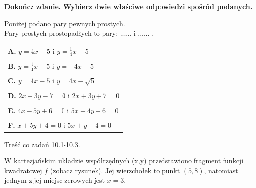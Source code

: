 \documentclass[12pt,a4paper]{article}
\theoremstyle{break}
\begin{document}
	\begin{zad}[0-3]
		
	\end{zad} 

	\begin{zad}[0-2]
		\textbf{Dokończ zdanie. Wybierz \underline{dwie} właściwe odpowiedzi spośród podanych.}
	\end{zad} 

	Poniżej podano pary pewnych prostych.
	\\
	
	Pary prostych prostopadłych to pary: ...... i ...... .
	
	\vspace{0.5cm}
	\begin{tabular}{p{14cm}}
		\textbf{A. }$y=4x-5$ i $y=\frac{1}{4}x-5$\\
		\\
		\textbf{B. }$y=\frac{1}{4}x+5$ i $y=-4x+5$\\
		\\
		\textbf{C. }$y=4x-5$ i $y=4x-\sqrt{5}$\\
		\\
		\textbf{D. }$2x-3y-7=0$ i $2x+3y+7=0$\\
		\\
		\textbf{E. }$4x-5y+6=0$ i $5x+4y-6=0$\\
		\\
		\textbf{F. }$x+5y+4=0$ i $5x+y-4=0$\\
	\end{tabular}
		
	
		\newpage
		\begin{zad}
			Treść co zadań 10.1-10.3.
		\end{zad}
	
		W kartezjańskim układzie współrzędnych (x,y) przedstawiono fragment funkcji kwadratowej $f$ (zobacz rysunek). Jej wierzchołek to punkt $(5,8)$, natomiast jednym z jej miejsc zerowych jest $x=3$.
		
\end{document}
